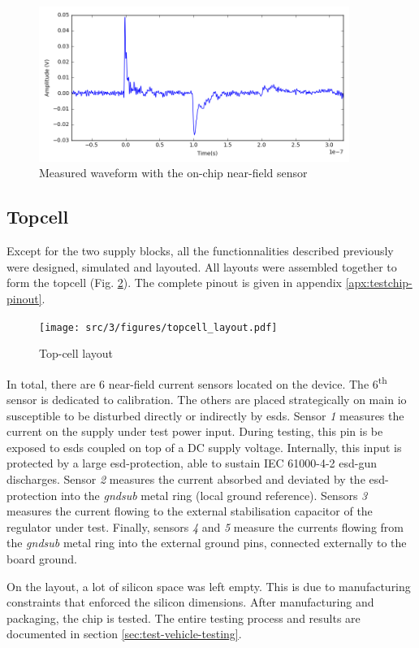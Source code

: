 \begin{figure}[!h]
  \centering
  \includegraphics[width=0.9\textwidth]{src/3/figures/measured_waveform.png}
  \caption{Measured waveform with the on-chip near-field sensor}
  \label{fig:nfs-wvf}
\end{figure}

\subsection{Topcell}
Except for the two supply blocks, all the functionnalities described previously were designed, simulated and layouted.
All layouts were assembled together to form the topcell (Fig. \ref{fig:top-cell-layout}).
The complete pinout is given in appendix \ref{apx:testchip-pinout}.

\begin{figure}[!h]
  \centering
  \texttt{[image: src/3/figures/topcell\_layout.pdf]}
  \caption{Top-cell layout}
  \label{fig:top-cell-layout}
\end{figure}

In total, there are 6 near-field current sensors located on the device.
The 6\textsuperscript{th} sensor is dedicated to calibration.
The others are placed strategically on main \gls{io} susceptible to be disturbed directly or indirectly by \gls{esd}s.
Sensor \textit{1} measures the current on the supply under test power input.
During testing, this pin is be exposed to \gls{esd}s coupled on top of a DC supply voltage.
Internally, this input is protected by a large \gls{esd-protection}, able to sustain IEC 61000-4-2 \gls{esd-gun} discharges.
Sensor \textit{2} measures the current absorbed and deviated by the \gls{esd-protection} into the \textit{gndsub} metal ring (local ground reference).
Sensors \textit{3} measures the current flowing to the external stabilisation capacitor of the regulator under test.
Finally, sensors \textit{4} and \textit{5} measure the currents flowing from the \textit{gndsub} metal ring into the external ground pins, connected externally to the board ground.

On the layout, a lot of silicon space was left empty.
This is due to manufacturing constraints that enforced the silicon dimensions.
After manufacturing and packaging, the chip is tested.
The entire testing process and results are documented in section \ref{sec:test-vehicle-testing}.
